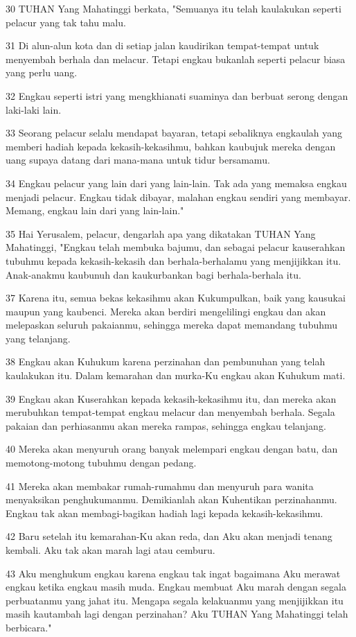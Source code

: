 \par 30 TUHAN Yang Mahatinggi berkata, "Semuanya itu telah kaulakukan seperti pelacur yang tak tahu malu.
\par 31 Di alun-alun kota dan di setiap jalan kaudirikan tempat-tempat untuk menyembah berhala dan melacur. Tetapi engkau bukanlah seperti pelacur biasa yang perlu uang.
\par 32 Engkau seperti istri yang mengkhianati suaminya dan berbuat serong dengan laki-laki lain.
\par 33 Seorang pelacur selalu mendapat bayaran, tetapi sebaliknya engkaulah yang memberi hadiah kepada kekasih-kekasihmu, bahkan kaubujuk mereka dengan uang supaya datang dari mana-mana untuk tidur bersamamu.
\par 34 Engkau pelacur yang lain dari yang lain-lain. Tak ada yang memaksa engkau menjadi pelacur. Engkau tidak dibayar, malahan engkau sendiri yang membayar. Memang, engkau lain dari yang lain-lain."
\par 35 Hai Yerusalem, pelacur, dengarlah apa yang dikatakan TUHAN Yang Mahatinggi, "Engkau telah membuka bajumu, dan sebagai pelacur kauserahkan tubuhmu kepada kekasih-kekasih dan berhala-berhalamu yang menjijikkan itu. Anak-anakmu kaubunuh dan kaukurbankan bagi berhala-berhala itu.
\par 37 Karena itu, semua bekas kekasihmu akan Kukumpulkan, baik yang kausukai maupun yang kaubenci. Mereka akan berdiri mengelilingi engkau dan akan melepaskan seluruh pakaianmu, sehingga mereka dapat memandang tubuhmu yang telanjang.
\par 38 Engkau akan Kuhukum karena perzinahan dan pembunuhan yang telah kaulakukan itu. Dalam kemarahan dan murka-Ku engkau akan Kuhukum mati.
\par 39 Engkau akan Kuserahkan kepada kekasih-kekasihmu itu, dan mereka akan merubuhkan tempat-tempat engkau melacur dan menyembah berhala. Segala pakaian dan perhiasanmu akan mereka rampas, sehingga engkau telanjang.
\par 40 Mereka akan menyuruh orang banyak melempari engkau dengan batu, dan memotong-motong tubuhmu dengan pedang.
\par 41 Mereka akan membakar rumah-rumahmu dan menyuruh para wanita menyaksikan penghukumanmu. Demikianlah akan Kuhentikan perzinahanmu. Engkau tak akan membagi-bagikan hadiah lagi kepada kekasih-kekasihmu.
\par 42 Baru setelah itu kemarahan-Ku akan reda, dan Aku akan menjadi tenang kembali. Aku tak akan marah lagi atau cemburu.
\par 43 Aku menghukum engkau karena engkau tak ingat bagaimana Aku merawat engkau ketika engkau masih muda. Engkau membuat Aku marah dengan segala perbuatanmu yang jahat itu. Mengapa segala kelakuanmu yang menjijikkan itu masih kautambah lagi dengan perzinahan? Aku TUHAN Yang Mahatinggi telah berbicara."
